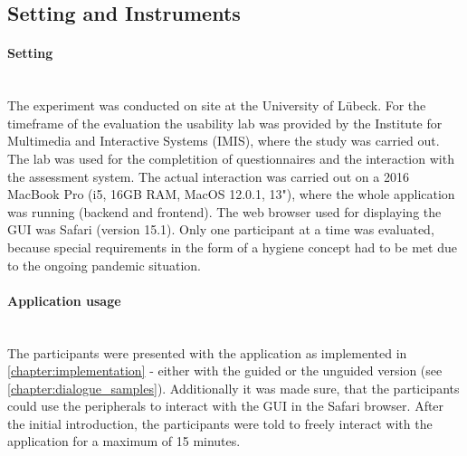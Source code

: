 \documentclass[11pt,a4paper,english]{scrreprt}
\begin{document}
\subsection{Setting and Instruments}
\paragraph{Setting}\mbox{} \\
The experiment was conducted on site at the University of Lübeck. For the timeframe of the evaluation the usability lab was provided by the Institute for Multimedia and Interactive Systems (IMIS), where the study was carried out. The lab was used for the completition of questionnaires and the interaction with the assessment system. The actual interaction was carried out on a 2016 MacBook Pro (i5, 16GB RAM, MacOS 12.0.1, 13"), where the whole application was running (backend and frontend). The web browser used for displaying the GUI was Safari (version 15.1). Only one participant at a time was evaluated, because special requirements in the form of a hygiene concept had to be met due to the ongoing pandemic situation.

\paragraph{Application usage}\mbox{} \\
The participants were presented with the application as implemented in \autoref{chapter:implementation} - either with the guided or the unguided version (see \autoref{chapter:dialogue_samples}). Additionally it was made sure, that the participants could use the peripherals to interact with the GUI in the Safari browser. After the initial introduction, the participants were told to freely interact with the application for a maximum of 15 minutes.
\end{document}
